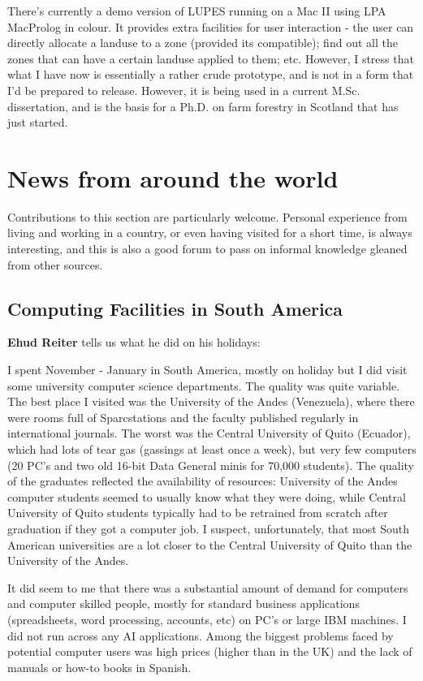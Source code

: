 There's currently a demo version of LUPES running on a Mac II using LPA
MacProlog in colour.   It provides extra facilities for user interaction - the
user can directly allocate a landuse to a zone (provided its compatible); find
out all the zones that can have a certain landuse applied to them; etc.
However, I stress that what I have now is essentially a rather crude
prototype, and is not in a form that I'd be prepared to release. However, it
is being used in a current M.Sc. dissertation, and is the basis for a Ph.D. on
farm forestry in Scotland that has just started.

\section{News from around the world}
Contributions to this section are particularly welcome. Personal
experience from living and working in a country, or even having
visited for a short time, is always interesting, and this is also a
good forum to pass on informal knowledge gleaned from other sources.

\subsection{Computing Facilities in South America}
{\bf Ehud Reiter} tells us what he did on his holidays:

I spent November - January in South America, mostly on holiday but I did
visit some university computer science departments.  The quality was quite
variable.  The best place I visited was the University of the Andes
(Venezuela), where there were rooms full of Sparcstations and the
faculty published regularly 
in international journals.  The worst was the Central University of Quito
(Ecuador), which had lots of tear gas (gassings at least once a week), but
very few computers (20 PC's and two old 16-bit Data General minis for 70,000
students).  The quality of the graduates reflected the availability of
resources: University of the Andes computer students seemed to usually know
what they were doing, while Central University of Quito students typically
had to be retrained from scratch after graduation if they got a computer job.
I suspect, unfortunately, that most South American universities are a lot
closer to the Central University of Quito than the University of the Andes.

It did seem to me that there was a substantial amount of demand for computers
and computer skilled people, mostly for standard business applications
(spreadsheets, word processing, accounts, etc) on PC's or large IBM machines.
I did not run across any AI applications.  Among the biggest problems faced
by potential computer users was high prices (higher than in the UK) and
the lack of manuals or how-to books in Spanish.

